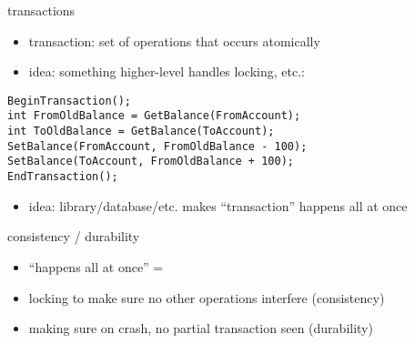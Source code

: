 \begin{frame}[fragile]{transactions}
    \begin{itemize}
    \item transaction: set of operations that occurs atomically
    \item idea: something higher-level handles locking, etc.:
   \end{itemize}
\begin{Verbatim}
BeginTransaction();
int FromOldBalance = GetBalance(FromAccount);
int ToOldBalance = GetBalance(ToAccount);
SetBalance(FromAccount, FromOldBalance - 100);
SetBalance(ToAccount, FromOldBalance + 100);
EndTransaction();
\end{Verbatim}
    \begin{itemize}
    \item idea: library/database/etc. makes ``transaction'' happens all at once
    \end{itemize}
\end{frame}

\begin{frame}{consistency / durability}
    \begin{itemize}
    \item ``happens all at once'' = 
    \vspace{.5cm}
    \item locking to make sure no other operations interfere (consistency)
    \item making sure on crash, no partial transaction seen (durability)
    \end{itemize}
\end{frame}

